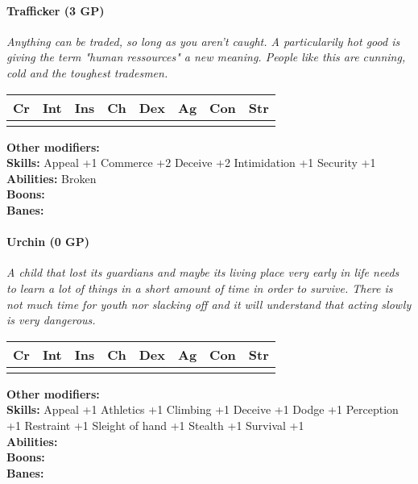 \documentclass[12pt,a4paper,openany]{book}
\begin{document}
	\hrulefill
	\paragraph*{Trafficker (3 GP)}
	\textit{Anything can be traded, so long as you aren't caught. A particularily hot good is giving the term "human ressources" a new meaning. People like this are cunning, cold and the toughest tradesmen.}\par
	\begin{tabular}{|l|l|l|l|l|l|l|l|}
		\hline
		Cr & Int & Ins & Ch & Dex & Ag & Con & Str \\ \hline
		&  &  &  &  &  &  &  \\ \hline
	\end{tabular}\par
	\noindent\textbf{Other modifiers:} \\
	\textbf{Skills:} Appeal +1
	Commerce +2
	Deceive +2
	Intimidation +1
	Security +1\\
	\textbf{Abilities:} Broken\\
	\textbf{Boons:} \\
	\textbf{Banes:}
	
	\hrulefill
	\paragraph*{Urchin (0 GP)}
	\textit{A child that lost its guardians and maybe its living place very early in life needs to learn a lot of things in a short amount of time in order to survive. There is not much time for youth nor slacking off and it will understand that acting slowly is very dangerous.}\par
	\begin{tabular}{|l|l|l|l|l|l|l|l|}
		\hline
		Cr & Int & Ins & Ch & Dex & Ag & Con & Str \\ \hline
		&  &  &  &  &  &  &  \\ \hline
	\end{tabular}\par
	\noindent\textbf{Other modifiers:} \\
	\textbf{Skills:} Appeal +1
	Athletics +1
	Climbing +1
	Deceive +1
	Dodge +1
	Perception +1
	Restraint +1
	Sleight of hand +1
	Stealth +1
	Survival +1\\
	\textbf{Abilities:} \\
	\textbf{Boons:} \\
	\textbf{Banes:} \\
	
	\hrulefill
\end{document}
